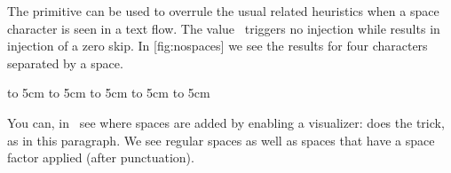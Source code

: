The \type {\nospaces} primitive can be used to overrule the usual \type
{\spaceskip} related heuristics when a space character is seen in a text flow.
The value~ triggers no injection while  results in injection of a
zero skip. In  [fig:nospaces] we see the results for four characters
separated by a space.

\startplacefigure[reference=fig:nospaces,title={The \type {nospaces} options.}]
 {}
    { to 5cm{\hss}} {}
    { to 5cm{\hss}} {}
    { to 5cm{\hss}} {}
    { to 5cm{\hss}} {}
    { to 5cm{\hss}} {}
\stopcombination
\stopplacefigure

\start \showmakeup[space]
You can, in \CONTEXT\ see where spaces are added by enabling a visualizer: \type
{\showmakeup [space]} does the trick, as in this paragraph. We see
regular spaces as well as spaces that have a space factor applied (after
punctuation).
\stop

\stopsection

\stopdocument
